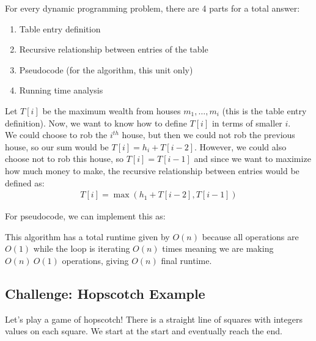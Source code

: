 \documentclass[14pt]{extarticle}
\begin{document}
    For every dynamic programming problem, there are 4 parts for a total 
    answer:
    \begin{enumerate}
        \item Table entry definition
        \item Recursive relationship between entries of the table
        \item Pseudocode (for the algorithm, this unit only)
        \item Running time analysis
    \end{enumerate}

    Let $T[i]$ be the maximum wealth from houses $m_1, \ldots, m_i$ (this
    is the table entry definition). Now, we want to know how to define
    $T[i]$ in terms of smaller $i$.\\

    We could choose to rob the $i^{th}$ house, but then we could not
    rob the previous house, so our sum would be $T[i] = h_i + T[i-2]$. However,
    we could also choose not to rob this house, so $T[i] = T[i-1]$ and since
    we want to maximize how much money to make, the recursive relationship
    between entries would be defined as:
    \begin{align*}
        T[i] = \max(h_1 + T[i-2], T[i-1])
    \end{align*}

    For pseudocode, we can implement this as:

    \begin{algorithm}[H]
    \end{algorithm}

    This algorithm has a total runtime given by $O(n)$ because all operations
    are $O(1)$ while the loop is iterating $O(n)$ times meaning we are making
    $O(n)\ O(1)$ operations, giving $O(n)$ final runtime.

    \subsection*{Challenge: Hopscotch Example}
    Let's play a game of hopscotch! There is a straight line of squares with
    integers values on each square. We start at the start and eventually reach
    the end.\\
\end{document}
